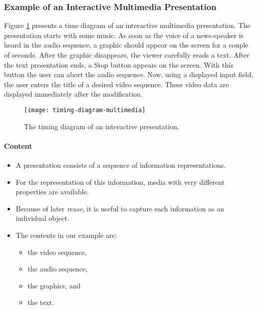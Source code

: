 \subsubsection{Example of an Interactive Multimedia Presentation}
Figure {\ref{fig:timing-diagram-multimedia}} presents a time diagram of an interactive multimedia presentation. The presentation starts with some music. As soon as the voice of a news-speaker is heard in the audio sequence, a graphic should appear on the screen for a couple of seconds. After the graphic disappears, the viewer carefully reads a text. After the text presentation ends, a Stop button appears on the screen. With this button the user can abort the audio sequence. Now, using a displayed input field, the user enters the title of a desired video sequence. These video data are displayed immediately after the modification.

\begin{figure}[ht!]
	\centering
	\texttt{[image: timing-diagram-multimedia]}
	\caption{The timing diagram of an interactive presentation.}{\label{fig:timing-diagram-multimedia}}
\end{figure}


\begin{multicols}{2}
	\paragraph*{Content}
	\begin{itemize}
		\item A presentation consists of a sequence of information representations. 
		\item For the representation of this information, media with very different properties are available. 
		\item Because of later \textit{reuse}, it is useful to capture each information	as an individual object. 
		\item The contents in our example are: 
		\begin{itemize}
			\item the video sequence, 
			\item the audio sequence, 
			\item the graphics, and 
			\item the text.
		\end{itemize}
	\end{itemize}
\end{multicols}


